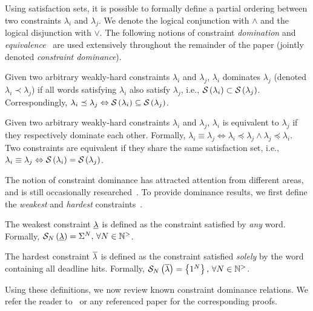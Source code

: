 Using satisfaction sets, it is possible to formally define a partial ordering between two constraints $\lambda_i$ and $\lambda_j$.
We denote the logical conjunction with $\land$ and the logical disjunction with $\lor$.
The following notions of constraint \emph{domination} and \emph{equivalence}~\cite{Bernat:2001, Bernat:1998} are used extensively throughout the remainder of the paper (jointly denoted \emph{constraint dominance}).
%
\begin{definition}%
\label{def:domination}%
    Given two arbitrary weakly-hard constraints $\lambda_i$ and $\lambda_j$, $\lambda_i$ dominates $\lambda_j$ (denoted $\lambda_i \prec \lambda_j$) if all words satisfying $\lambda_i$ also satisfy $\lambda_j$, i.e., $\mathcal{S}_{}\left( \lambda_i \right) \subset \mathcal{S}_{}\left( \lambda_j \right)$.
    Correspondingly, $\lambda_i \preceq \lambda_j \Leftrightarrow \mathcal{S}_{}\left( \lambda_i \right) \subseteq \mathcal{S}_{}\left( \lambda_j \right)$.
\end{definition}
%
\begin{definition}%
\label{def:equivalence}%
    Given two arbitrary weakly-hard constraints $\lambda_i$ and $\lambda_j$, $\lambda_i$ is equivalent to $\lambda_j$ if they respectively dominate each other.
    Formally, $\lambda_i \equiv \lambda_j \Leftrightarrow \lambda_i \preceq \lambda_j \land \lambda_j \preceq \lambda_i$. Two constraints are equivalent if they share the same satisfaction set, i.e., $\lambda_i \equiv \lambda_j \Leftrightarrow \mathcal{S}_{}\left( \lambda_i \right) = \mathcal{S}_{}\left( \lambda_j \right)$.
\end{definition}

The notion of constraint dominance has attracted attention from different areas, and is still occasionally researched~\cite{Wu:2020, Tu:2007}.
To provide dominance results, we first define the \emph{weakest} and \emph{hardest} constraints~\cite{Bernat:2001, Bernat:1998}.
%
\begin{definition}%
\label{def:weakest}%
    The weakest constraint $\underline{\lambda}$ is defined as the constraint satisfied by \emph{any} word.
    Formally, $\mathcal{S}_{N}\left( \underline{\lambda} \right) = \Sigma^N,\,\forall N \in \mathbb{N}^{>}$.
\end{definition}
%
\begin{definition}%
\label{def:hardest}%
    The hardest constraint $\overline{\lambda}$ is defined as the constraint satisfied \emph{solely} by the word containing all deadline hits.
    Formally, $\mathcal{S}_{N}\left( \overline{\lambda} \right) = \left\{ 1^N \right\},\,\forall N \in \mathbb{N}^{>}$.
\end{definition}
Using these definitions, we now review known constraint dominance relations.
We refer the reader to~\cite{Bernat:1998} or any referenced paper for the corresponding proofs.

